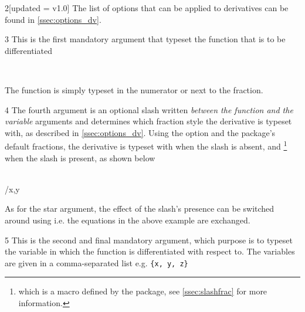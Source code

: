 \begin{function}
\begin{argument}{2}[updated = v1.0]
			\noindent The list of options that can be applied to derivatives can be found in \cref{ssec:options_dv}.
			
		\end{argument}
		
		\begin{argument}{3}
			This is the first mandatory argument that typeset the function that is to be differentiated
			
			\begin{example}
				 \\
			\end{example}
			
			\noindent The function is simply typeset in the numerator or next to the fraction.
		\end{argument}
		
		\begin{argument}{4}
			The fourth argument is an optional slash written \emph{between the function and the variable} arguments and determines which fraction style the derivative is typeset with, as described in \cref{ssec:options_dv}. Using the option  and the package's default fractions, the derivative is typeset with  when the slash is absent, and \footnote{which is a macro defined by the package, see \cref{ssec:slashfrac} for more information.\label{foot:sfrac}} when the slash is present, as shown below
			
			\begin{example}
				\pdv{f}{x,y} \\
				\pdv{f}/{x,y}
			\end{example}
			
			\noindent As for the star argument, the effect of the slash's presence can be switched around using  i.e. the equations in the above example are exchanged.
		\end{argument}
		
		\begin{argument}{5}
			This is the second and final mandatory argument, which purpose is to typeset the variable in which the function is differentiated with respect to. The variables are given in a comma-separated list e.g. \texttt{\{x, y, z\}}
			

\end{argument}
\end{function}
